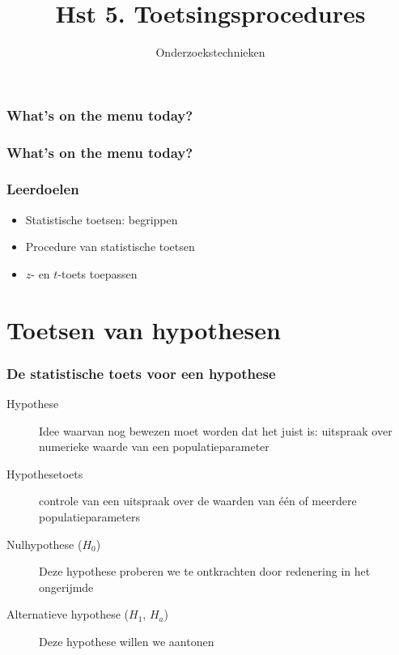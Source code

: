 \documentclass[aspectratio=169]{beamer}
\title{Hst 5. Toetsingsprocedures}
\subtitle{Onderzoekstechnieken}
\begin{document}
\begin{frame}
  \maketitle
\end{frame}

\begin{frame}
  \frametitle{What's on the menu today?}
  
  \tableofcontents
\end{frame}

\begin{frame}
  \frametitle{What's on the menu today?}
  
  \tableofcontents
\end{frame}

\begin{frame}
  \frametitle{Leerdoelen}
  
  \begin{itemize}
    \item Statistische toetsen: begrippen
    \item Procedure van statistische toetsen
    \item $z$- en $t$-toets toepassen
  \end{itemize}
\end{frame}


\section{Toetsen van hypothesen}

\begin{frame}
  \frametitle{De statistische toets voor een hypothese}
  
  \begin{description}
    \item[Hypothese] Idee waarvan nog bewezen moet worden dat het juist is: uitspraak over numerieke waarde van een populatieparameter
    \item[Hypothesetoets] controle van een uitspraak over de waarden van één of meerdere populatieparameters
    \item[Nulhypothese ($H_0$)] Deze hypothese proberen we te ontkrachten door redenering in het ongerijmde
    \item[Alternatieve hypothese ($H_1$, $H_a$)] Deze hypothese willen we aantonen
  \end{description}
\end{frame}
\end{document}
